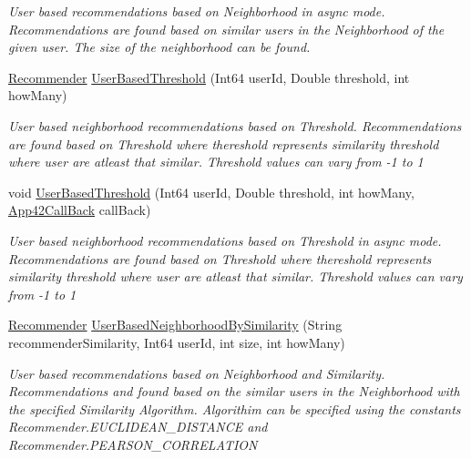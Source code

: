 \begin{DoxyCompactItemize}
\begin{DoxyCompactList}\small\item\em User based recommendations based on Neighborhood in async mode. Recommendations are found based on similar users in the Neighborhood of the given user. The size of the neighborhood can be found. \end{DoxyCompactList}\item 
\hyperlink{classcom_1_1shephertz_1_1app42_1_1paas_1_1sdk_1_1csharp_1_1recommend_1_1_recommender}{Recommender} \hyperlink{classcom_1_1shephertz_1_1app42_1_1paas_1_1sdk_1_1csharp_1_1recommend_1_1_recommender_service_a9bd13c805df69a08cd1d6ae88b38e1dd}{User\+Based\+Threshold} (Int64 user\+Id, Double threshold, int how\+Many)
\begin{DoxyCompactList}\small\item\em User based neighborhood recommendations based on Threshold. Recommendations are found based on Threshold where thereshold represents similarity threshold where user are atleast that similar. Threshold values can vary from -\/1 to 1 \end{DoxyCompactList}\item 
void \hyperlink{classcom_1_1shephertz_1_1app42_1_1paas_1_1sdk_1_1csharp_1_1recommend_1_1_recommender_service_a51a869cee99b7f02dd401028bf72cb21}{User\+Based\+Threshold} (Int64 user\+Id, Double threshold, int how\+Many, \hyperlink{interfacecom_1_1shephertz_1_1app42_1_1paas_1_1sdk_1_1csharp_1_1_app42_call_back}{App42\+Call\+Back} call\+Back)
\begin{DoxyCompactList}\small\item\em User based neighborhood recommendations based on Threshold in async mode. Recommendations are found based on Threshold where thereshold represents similarity threshold where user are atleast that similar. Threshold values can vary from -\/1 to 1 \end{DoxyCompactList}\item 
\hyperlink{classcom_1_1shephertz_1_1app42_1_1paas_1_1sdk_1_1csharp_1_1recommend_1_1_recommender}{Recommender} \hyperlink{classcom_1_1shephertz_1_1app42_1_1paas_1_1sdk_1_1csharp_1_1recommend_1_1_recommender_service_ab470b785839abe646cbb94bfda19fbe4}{User\+Based\+Neighborhood\+By\+Similarity} (String recommender\+Similarity, Int64 user\+Id, int size, int how\+Many)
\begin{DoxyCompactList}\small\item\em User based recommendations based on Neighborhood and Similarity. Recommendations and found based on the similar users in the Neighborhood with the specified Similarity Algorithm. Algorithim can be specified using the constants Recommender.\+E\+U\+C\+L\+I\+D\+E\+A\+N\+\_\+\+D\+I\+S\+T\+A\+N\+C\+E and Recommender.\+P\+E\+A\+R\+S\+O\+N\+\_\+\+C\+O\+R\+R\+E\+L\+A\+T\+I\+O\+N \end{DoxyCompactList}\item 

\end{DoxyCompactItemize}
